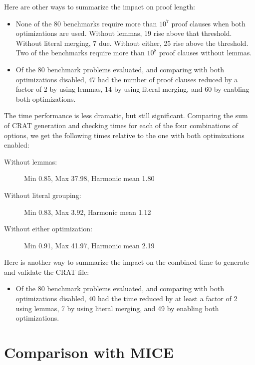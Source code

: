 \documentclass[letterpaper,USenglish,cleveref, autoref, thm-restate]{lipics-v2021}
\begin{document}
Here are other ways to summarize the impact on proof length:
\begin{itemize}
\item None of the 80 benchmarks require more than $10^7$
proof clauses when both optimizations are used.  Without lemmas, 19
rise above that threshold.  Without literal merging, 7 due.  Without
either, 25 rise above the threshold.  Two of the benchmarks require
more than $10^8$ proof clauses without lemmas.
\item
  Of the 80 benchmark problems evaluated, and comparing with both
  optimizations disabled, 47 had the number of proof clauses reduced
  by a factor of 2 by using lemmas, 14 by using literal merging, and
  60 by enabling both optimizations.
\end{itemize}

The time performance is less dramatic, but still significant.
Comparing the sum of CRAT generation and checking times for each of
the four combinations of options, we get the following times relative
to the one with both optimizations enabled:
\begin{description}
\item[Without lemmas:] Min 0.85, Max 37.98, Harmonic mean 1.80
\item[Without literal grouping:] Min 0.83, Max 3.92, Harmonic mean 1.12
\item[Without either optimization:] Min 0.91, Max 41.97, Harmonic mean 2.19
\end{description}

Here is another way to summarize the impact on the combined time to generate and validate the CRAT file:
\begin{itemize}
\item Of the 80 benchmark problems evaluated, and comparing with both
  optimizations disabled, 40 had the time reduced by at least a factor of 2
  using lemmas, 7 by using literal merging, and 49 by enabling both
  optimizations.
\end{itemize}

\section{Comparison with MICE}
\end{document}
